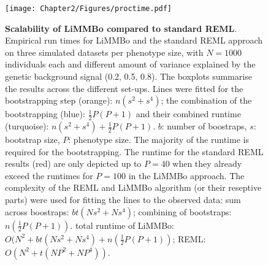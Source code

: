 \begin{figure}[hbtp]
	\centering
	\texttt{[image: Chapter2/Figures/proctime.pdf]}
	\caption[\textbf{Scalability of LiMMBo  compared to standard REML.}]{\textbf{Scalability of LiMMBo  compared to standard REML}. Empirical run times for LiMMBo and the standard REML approach on three simulated datasets per phenotype size, with \(N=1000\) individuals each and different amount of variance explained by the genetic background signal (\num{0.2}, \num{0.5}, \num{0.8}). The boxplots summarise the results across the different set-ups. Lines were fitted for the bootstrapping step (orange): \(n(s^2 + s^4)\); the combination of the bootstrapping (blue): \(\frac{1}{2}P(P+1)\) and their combined runtime (turquoise):  \(n(s^2 + s^4) + \frac{1}{2}P(P+1)\). \(b\): number of boostraps, \(s\): bootstrap size, \(P\): phenotype size. The majority of the runtime is required for the bootstrapping. The runtime for the standard REML results (red) are only depicted up to \(P=40\) when they already exceed the runtimes for \(P=100\) in the LiMMBo approach. The complexity of the REML and LiMMBo algorithm (or their reseptive parts) were used for fitting the lines to the observed data: sum across boostraps: \(bt(Ns^2 + Ns^4)\); combining of bootstraps: \(n(\frac{1}{2}P(P+1))\). total runtime of LiMMBo: \(O(N^2 + bt(Ns^2 + Ns^4) + n(\frac{1}{2}P(P+1))\); REML: \(O(N^2 + t(NP^2 + NP^4))\). }
	 	\label{fig:proctime}
\end{figure}

